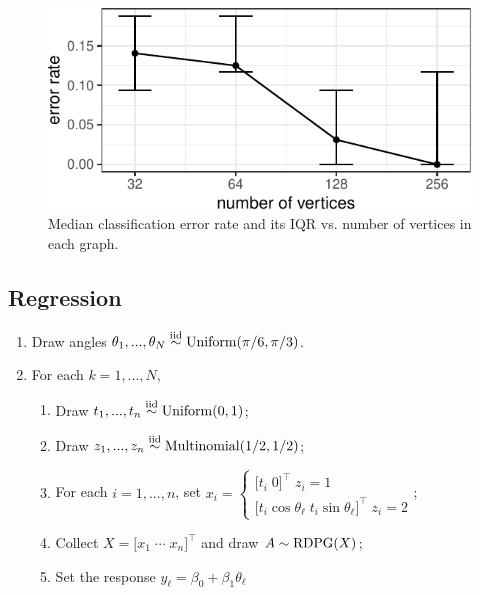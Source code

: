 \documentclass[12pt]{article}
\providecommand{\tightlist}{%
  \setlength{\itemsep}{0pt}\setlength{\parskip}{0pt}}
\begin{document}
\begin{figure}[H]

{\centering \includegraphics{draft_files/figure-latex/classification-sim-1} 

}

\caption{Median classification error rate and its IQR vs. number of vertices in each graph.}\label{fig:classification-sim}
\end{figure}

\hypertarget{regression}{%
\subsection{Regression}\label{regression}}

\begin{enumerate}
\def\labelenumi{\arabic{enumi}.}
\tightlist
\item
  Draw angles
  \(\theta_1, ..., \theta_N \stackrel{\mathrm{iid}}{\sim} \mathrm{Uniform}(\pi / 6, \pi / 3)\).
\item
  For each \(k = 1, ..., N\),

  \begin{enumerate}
  \def\labelenumii{\roman{enumii}.}
  \tightlist
  \item
    Draw \(t_1, ..., t_n \stackrel{\mathrm{iid}}{\sim} \mathrm{Uniform}(0, 1)\);
  \item
    Draw \(z_1, ..., z_n \stackrel{\mathrm{iid}}{\sim} \mathrm{Multinomial}(1/2, 1/2)\);
  \item
    For each \(i = 1, ..., n\), set
    \(x_i = \begin{cases} \bigl[ t_i \; 0 \bigr]^\top \; z_i = 1 \\ \bigl[ t_i \cos \theta_\ell \; t_i \sin \theta_\ell \bigr]^\top \; z_i = 2 \end{cases}\);
  \item
    Collect \(X = \bigl[ x_1 \; \cdots \; x_n \bigr]^\top\) and draw
    \(A \sim \mathrm{RDPG}(X)\);
  \item
    Set the response \(y_\ell = \beta_0 + \beta_1 \theta_\ell\)
  \end{enumerate}
\end{enumerate}
\end{document}
